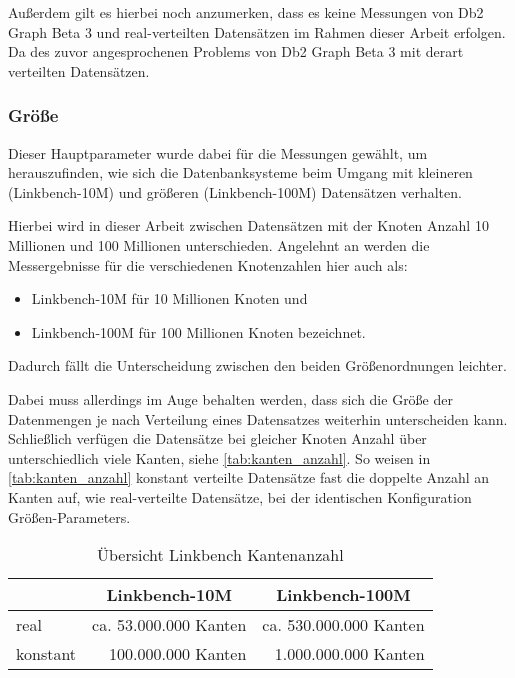 Außerdem gilt es hierbei noch anzumerken, dass es keine Messungen von Db2 Graph Beta 3 und real-verteilten Datensätzen im Rahmen dieser Arbeit erfolgen. Da des zuvor angesprochenen Problems von Db2 Graph Beta 3 mit derart verteilten Datensätzen.

\subsubsection{Größe}
Dieser Hauptparameter wurde dabei für die Messungen gewählt, um herauszufinden, wie sich die Datenbanksysteme beim Umgang mit kleineren (Linkbench-10M) und größeren (Linkbench-100M) Datensätzen verhalten. 

Hierbei wird in dieser Arbeit zwischen Datensätzen mit der Knoten Anzahl 10 Millionen und 100 Millionen unterschieden. Angelehnt an \cite{sigmod_tian} werden die Messergebnisse für die verschiedenen Knotenzahlen hier auch als:
\begin{itemize}
    \item Linkbench-10M für 10 Millionen Knoten und 
    \item Linkbench-100M für 100 Millionen Knoten bezeichnet.
\end{itemize}
Dadurch fällt die Unterscheidung zwischen den beiden Größenordnungen leichter. 

Dabei muss allerdings im Auge behalten werden, dass sich die Größe der Datenmengen je nach Verteilung eines Datensatzes weiterhin unterscheiden kann. Schließlich verfügen die Datensätze bei gleicher Knoten Anzahl über unterschiedlich viele Kanten, siehe \autoref{tab:kanten_anzahl}. So weisen in \autoref{tab:kanten_anzahl} konstant verteilte Datensätze fast die doppelte Anzahl an Kanten auf, wie real-verteilte Datensätze, bei der identischen Konfiguration Größen-Parameters. 

\begin{table}[ht]
    \centering
    \begin{tabular}{l|r|r}
    \hline
    \rowcolor[HTML]{EFEFEF} 
    \multicolumn{1}{c|}{\cellcolor[HTML]{EFEFEF}\textbf{Verteilung}} & \multicolumn{1}{c|}{\cellcolor[HTML]{EFEFEF}\textbf{Linkbench-10M}} & \multicolumn{1}{c}{\cellcolor[HTML]{EFEFEF}\textbf{Linkbench-100M}} \\ \hline
    real & ca. 53.000.000 Kanten & ca. 530.000.000 Kanten \\
    konstant & 100.000.000 Kanten & 1.000.000.000 Kanten \\ \hline
    \end{tabular}
    \caption{Übersicht Linkbench Kantenanzahl}
    \label{tab:kanten_anzahl}
    \vspace{1em}
    \textit{}
\end{table}

